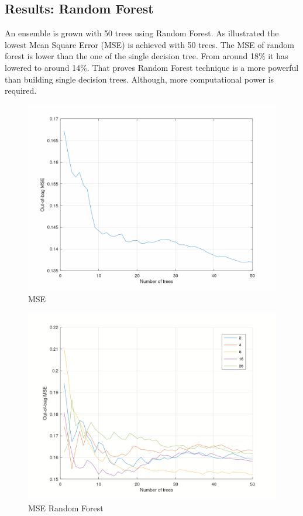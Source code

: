\documentclass{article}
\begin{document}
\subsection{Results: Random Forest}
An ensemble is grown with 50 trees using Random Forest. As illustrated the lowest Mean Square Error (MSE) is achieved with 50 trees. The MSE of random forest is lower than the one of the single decision tree. From around 18\% it has lowered to around 14\%. That proves Random Forest technique is a more powerful than building single decision trees. Although, more computational power is required.

\begin{figure}[H]
	\includegraphics[width=\textwidth,height=\textheight,keepaspectratio]{mse.png}
	\caption{MSE}
	\label{fig:MSE-general}
\end{figure}

\begin{figure}[H]
	\includegraphics[width=\textwidth,height=\textheight,keepaspectratio]{mse_rf.png}
	\caption{MSE Random Forest}
	\label{fig:MSE}
\end{figure}
\end{document}
